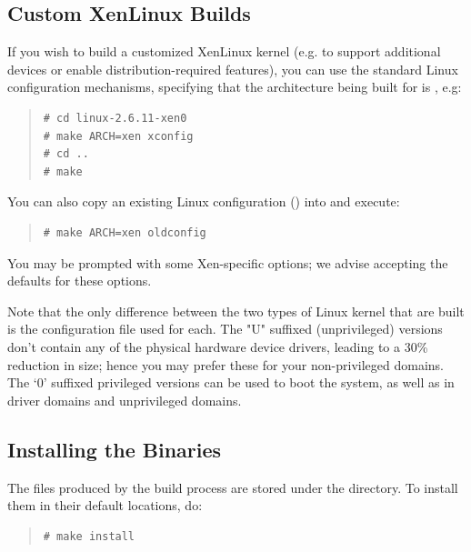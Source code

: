 \documentclass[11pt,twoside,final,openright]{report}
\begin{document}

\subsection{Custom XenLinux Builds}


If you wish to build a customized XenLinux kernel (e.g. to support
additional devices or enable distribution-required features), you can
use the standard Linux configuration mechanisms, specifying that the
architecture being built for is , e.g:
\begin{quote}
\begin{verbatim} 
# cd linux-2.6.11-xen0 
# make ARCH=xen xconfig 
# cd ..
# make
\end{verbatim} 
\end{quote} 

You can also copy an existing Linux configuration () 
into  and execute:  
\begin{quote}
\begin{verbatim} 
# make ARCH=xen oldconfig 
\end{verbatim} 
\end{quote} 

You may be prompted with some Xen-specific options; we 
advise accepting the defaults for these options.

Note that the only difference between the two types of Linux kernel
that are built is the configuration file used for each.  The "U"
suffixed (unprivileged) versions don't contain any of the physical
hardware device drivers, leading to a 30\% reduction in size; hence
you may prefer these for your non-privileged domains.  The `0'
suffixed privileged versions can be used to boot the system, as well
as in driver domains and unprivileged domains.


\subsection{Installing the Binaries}


The files produced by the build process are stored under the
 directory. To install them in their default
locations, do:
\begin{quote}
\begin{verbatim}
# make install
\end{verbatim} 
\end{quote}
\end{document}
